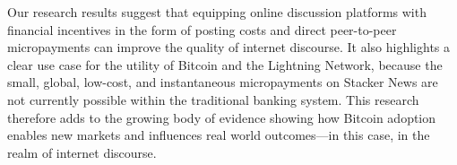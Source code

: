 Our research results suggest that equipping online discussion platforms with financial incentives in the form of posting costs and direct peer-to-peer micropayments can improve the quality of internet discourse. It also highlights a clear use case for the utility of Bitcoin and the Lightning Network, because the small, global, low-cost, and instantaneous micropayments on Stacker News are not currently possible within the traditional banking system. This research therefore adds to the growing body of evidence showing how Bitcoin adoption enables new markets and influences real world outcomes---in this case, in the realm of internet discourse.





